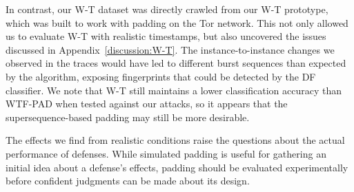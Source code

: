 \documentclass[USenglish,oneside,twocolumn]{article}
\begin{document}
In contrast, our W-T dataset was directly crawled from our W-T prototype, which was built to work with padding on the Tor network. This not only allowed us to evaluate W-T with realistic timestamps, but also uncovered the issues discussed in Appendix~\ref{discussion:W-T}. The instance-to-instance changes we observed in the traces would have led to different burst sequences than expected by the algorithm, exposing fingerprints that could be detected by the DF classifier. We note that W-T still maintains a lower classification accuracy than WTF-PAD when tested against our attacks, so it appears that the supersequence-based padding may still be more desirable.

The effects we find from realistic conditions raise the questions about the actual performance of defenses. While simulated padding is useful for gathering an initial idea about a defense's effects, padding should be evaluated experimentally before confident judgments can be made about its design. 
\end{document}
